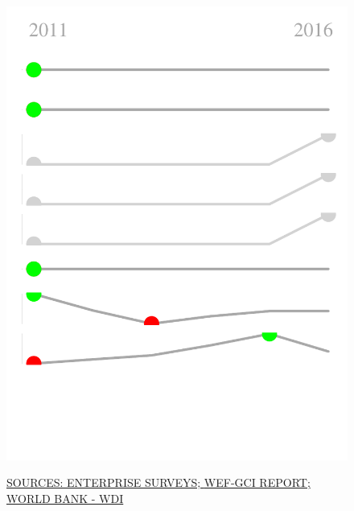 \documentclass{article}\usepackage[]{graphicx}\usepackage[]{color}
\makeatletter
\def\maxwidth{ %
  \ifdim\Gin@nat@width>\linewidth
    \linewidth
  \else
    \Gin@nat@width
  \fi
}
\makeatother
\begin{document}
\begin{figure}
\begin{minipage}[c]{0.95\textwidth}
\begin{minipage}[c]{0.125\textwidth}
{\centering \includegraphics[width=\maxwidth]{figure/sparklines_Supports-1} 

}



    \vspace*{-0.5cm}
  \end{minipage}
  
  \scriptsize{\href{http://www.enterprisesurveys.org/data/exploretopics/innovation-and-technology}{\textcolor[HTML]{22A6F5}{SOURCES: ENTERPRISE SURVEYS; }}\href{http://www3.weforum.org/docs/gcr/2015-2016/GCI_Dataset_2006-2015.xlsx}{\textcolor[HTML]{22A6F5}{WEF-GCI REPORT; }}\href{http://data.worldbank.org}{\textcolor[HTML]{22A6F5}{WORLD BANK - WDI}}}
\end{minipage}


\end{figure}
\end{document}
